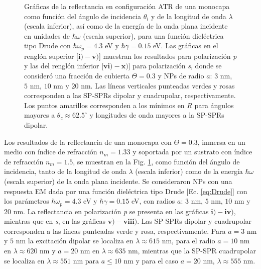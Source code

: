 \begin{figure}[h!]
\vspace*{-.5em}
	\caption{Gráficas de la reflectancia en configuración ATR de una monocapa como función del ángulo de incidencia $\theta_i$ y de la longitud de onda $\lambda$ (escala inferior), así como de la energía de la onda plana incidente en unidades de $\hbar\omega$ (escala superior), para una función dieléctrica tipo Drude con $\hbar\omega_p=4.3$ eV  y  $\hbar\gamma=0. 15$ eV.  Las gráficas   en el renglón superior [$\mathbf{i)-v)}$] muestran los resultados para  polarización \emph{p} y las del renglón inferior  [$\mathbf{vi)-x)}$]  para polarización  \emph{s}, donde se consideró una fracción de cubierta $\Theta = 0.3$ y  NPs de radio  $a$: $3$ nm, $5$ nm, $10$ nm y $20$ nm.  Las líneas verticales punteadas verdes y rosas corresponden a las SP-SPRs dipolar y  cuadrupolar, respectivamente.  Los puntos amarillos corresponden a los mínimos en $R$ para ángulos mayores a $\theta_c\approx 62.5^\circ$ y longitudes de onda mayores a la SP-SPRs dipolar.
}	\label{fig:R-RVar}	
	\end{figure}	

Los resultados de la reflectancia de una monocapa con $\Theta=0.3$, inmersa en un medio con índice de refracción $n_m = 1.33$ y soportada por un sustrato con índice de refracción $n_m= 1.5$, se muestran en la Fig.  \ref{fig:R-RVar}, como función del ángulo de incidencia, tanto de la longitud de onda $\lambda$ (escala inferior) como de la  energía $\hbar\omega$ (escala superior) de la onda plana incidente. Se consideraron NPs  con una respuesta EM dada por una función dieléctrica  tipo Drude [Ec. \eqref{eq:Drude}] con los parámetros $\hbar\omega_p =4.3$ eV y $\hbar\gamma=0.15$ eV, con radios $a$: $3$ nm, $5$ nm, $10$ nm y $20$ nm. La reflectancia en polarización \emph{p} se presenta en las gráficas $\mathbf{i)-iv)}$, mientras que en \emph{s}, en las gráficas $\mathbf{v)-viii)}$. Las SP-SPRs dipolar y cuadrupolar corresponden a las líneas punteadas verde y rosa, respectivamente. Para $a = 3$ nm y $5$ nm la excitación dipolar se localiza en $\lambda\approx 615$ nm, para el radio  $a = 10$ nm en $\lambda\approx 620$ nm y $a=20$ nm en $\lambda\approx 635$ nm, mientras que la SP-SPR cuadrupolar se localiza en $\lambda\approx 551$ nm para $a\leq 10$ nm y para el caso  $a=20$ nm, $\lambda \approx 555$ nm.	
	
